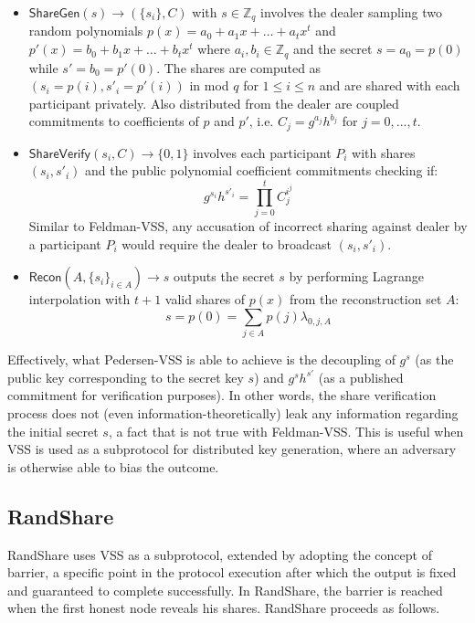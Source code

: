 \documentclass[letterpaper,twocolumn,10pt]{article}
\theoremstyle{definition}
\theoremstyle{remark}
\begin{document}
\begin{itemize}
\item $\mathsf{ShareGen}(s) \rightarrow (\{s_i\}, C)$ with $s \in \mathbb{Z}_q$ involves the dealer sampling two random polynomials $p(x) = a_0 + a_1x+ \ldots+a_tx^t$ and $p'(x) = b_0 + b_1x +\ldots+b_tx^t$ where $a_i, b_i \in \mathbb{Z}_q$ and the secret $s = a_0 = p(0)$ while $s' = b_0 = p'(0)$. The shares are computed as $(s_i = p(i), s'_i = p'(i))$ in mod $q$ for $1 \le i \le n$ and are shared with each participant privately. Also distributed from the dealer are coupled commitments to coefficients of $p$ and $p'$, i.e. $C_j = g^{a_j} h^{b_j}$ for $j = 0, ..., t$.
\item $\mathsf{ShareVerify}(s_i, C) \rightarrow \{0, 1\}$ involves each participant $P_i$ with shares $(s_i, s'_i)$ and the public polynomial coefficient commitments checking if:
$$g^{s_i} h^{s'_i} = \prod_{j = 0}^{t} C_j^{i^j}$$
Similar to Feldman-VSS, any accusation of incorrect sharing against dealer by a participant $P_i$ would require the dealer to broadcast $(s_i, s'_i)$.
\item $\mathsf{Recon}(A, \{s_i\}_{i \in A}) \rightarrow s$ outputs the secret $s$ by performing Lagrange interpolation with $t + 1$ valid shares of $p(x)$ from the reconstruction set $A$:
$$s = p(0) = \sum_{j \in A} p(j) \lambda_{0, j, A}$$
\end{itemize}

Effectively, what Pedersen-VSS is able to achieve is the decoupling of $g^s$ (as the public key corresponding to the secret key $s$) and $g^{s} h^{s'}$ (as a published commitment for verification purposes). In other words, the share verification process does not (even information-theoretically) leak any information regarding the initial secret $s$, a fact that is not true with Feldman-VSS. This is useful when VSS is used as a subprotocol for distributed key generation, where an adversary is otherwise able to bias the outcome.

\subsection{RandShare}
\label{appendix:randshare}
RandShare uses VSS as a subprotocol, extended by adopting the concept of barrier, a specific point in the protocol execution after which the output is fixed and guaranteed to complete successfully. In RandShare, the barrier is reached when the first honest node reveals his shares.
RandShare proceeds as follows.
\end{document}
